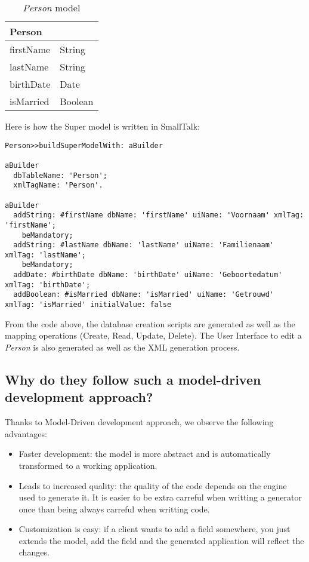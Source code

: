 \begin{table}[!ht]
\centering
\begin{tabular}{|ll|}
\hline
\multicolumn{2}{|l|}{Person} \\ \hline
firstName     & String     \\
lastName      & String     \\
birthDate     & Date       \\
isMarried     & Boolean    \\ \hline
\end{tabular}
\caption{\textit{Person} model}
\label{MDD:personmodel}
\end{table}

Here is how the Super model is written in SmallTalk:

\begin{lstlisting}
Person>>buildSuperModelWith: aBuilder

aBuilder
  dbTableName: 'Person';
  xmlTagName: 'Person'.
  
aBuilder
  addString: #firstName dbName: 'firstName' uiName: 'Voornaam' xmlTag: 'firstName';
    beMandatory;
  addString: #lastName dbName: 'lastName' uiName: 'Familienaam' xmlTag: 'lastName';
    beMandatory;
  addDate: #birthDate dbName: 'birthDate' uiName: 'Geboortedatum' xmlTag: 'birthDate';
  addBoolean: #isMarried dbName: 'isMarried' uiName: 'Getrouwd' xmlTag: 'isMarried' initialValue: false
\end{lstlisting}

From the code above, the database creation scripts are generated as well as the mapping operations (Create, Read, Update, Delete).
The User Interface to edit a \textit{Person} is also generated as well as the XML generation process.

\subsection{Why do they follow such a model-driven development approach?}
Thanks to Model-Driven development approach, we observe the following advantages:
\begin{itemize}
\item Faster development: the model is more abstract and is automatically transformed to a working application.
\item Leads to increased quality: the quality of the code depends on the engine used to generate it. It is easier to be extra carreful when writting a generator once than being always carreful when writting code.
\item Customization is easy: if a client wants to add a field somewhere, you just extends the model, add the field and the generated application will reflect the changes.
\end{itemize}


